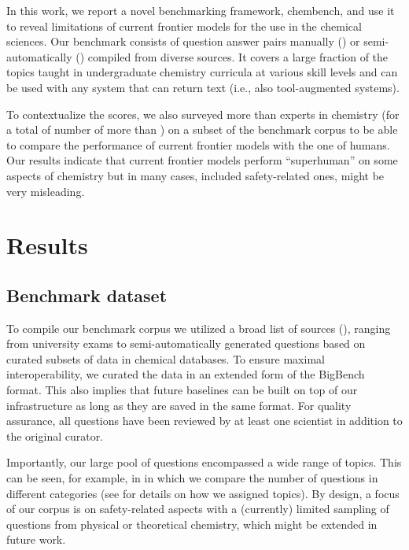 \documentclass[11pt, oneside]{article}
\begin{document}
In this work, we report a novel benchmarking framework, chembench, and use it to reveal limitations of current frontier models for the use in the chemical sciences.
Our benchmark consists of \unskip question answer pairs manually (\unskip) or semi-automatically (\unskip) compiled from diverse sources.
It covers a large fraction of the topics taught in undergraduate chemistry curricula at various skill levels and can be used with any system that can return text (i.e., also tool-augmented systems).

To contextualize the scores, we also surveyed more than  experts in chemistry (for a total of number of more than \unskip) on a subset of the benchmark corpus to be able to compare the performance of current frontier models with the one of humans.
Our results indicate that current frontier models perform \enquote{superhuman} on some aspects of chemistry but in many cases, included safety-related ones, might be very misleading.


\section{Results}

\subsection{Benchmark dataset}

To compile our benchmark corpus we utilized a broad list of sources (), ranging from university exams to semi-automatically generated questions based on curated subsets of data in chemical databases.
To ensure maximal interoperability, we curated the data in an extended form of the BigBench format.
This also implies that future baselines can be built on top of our infrastructure as long as they are saved in the same format.
For quality assurance, all questions have been reviewed by at least one scientist in addition to the original curator.

Importantly, our large pool of questions encompassed a wide range of topics.
This can be seen, for example, in  in which we compare the number of questions in different categories (see  for details on how we assigned topics).
By design, a focus of our corpus is on safety-related aspects with a (currently) limited sampling of questions from physical or theoretical chemistry, which might be extended in future work.
\end{document}
